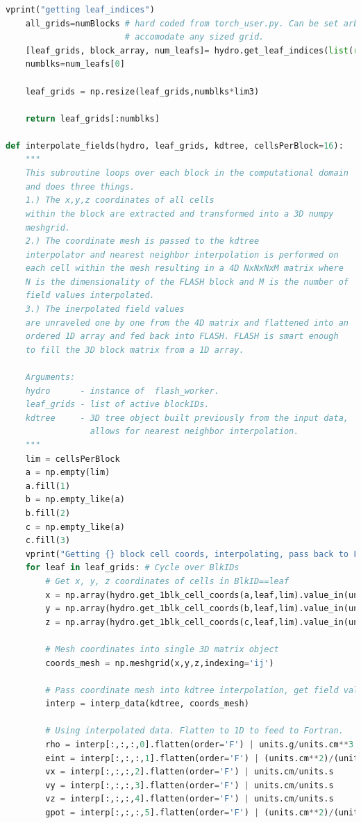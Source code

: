 \documentclass[twoside]{drexel-thesis}
\begin{document}
\begin{lstlisting}[language=python]
    vprint("getting leaf_indices")
    all_grids=numBlocks # hard coded from torch_user.py. Can be set arbitratily large to
                        # accomodate any sized grid.
    [leaf_grids, block_array, num_leafs]= hydro.get_leaf_indices(list(range(all_grids)))
    numblks=num_leafs[0]
    
    leaf_grids = np.resize(leaf_grids,numblks*lim3)
    
    return leaf_grids[:numblks]

def interpolate_fields(hydro, leaf_grids, kdtree, cellsPerBlock=16):
    """
    This subroutine loops over each block in the computational domain
    and does three things. 
    1.) The x,y,z coordinates of all cells
    within the block are extracted and transformed into a 3D numpy
    meshgrid. 
    2.) The coordinate mesh is passed to the kdtree 
    interpolator and nearest neighbor interpolation is performed on
    each cell within the mesh resulting in a 4D NxNxNxM matrix where
    N is the dimensionality of the FLASH block and M is the number of
    field values interpolated. 
    3.) The inerpolated field values
    are unraveled one by one from the 4D matrix and flattened into an
    ordered 1D array and fed back into FLASH. FLASH is smart enough
    to fill the 3D block matrix from a 1D array.
    
    Arguments:
    hydro      - instance of  flash_worker.
    leaf_grids - list of active blockIDs.
    kdtree     - 3D tree object built previously from the input data, 
                 allows for nearest neighbor interpolation.
    """
    lim = cellsPerBlock
    a = np.empty(lim)
    a.fill(1)
    b = np.empty_like(a)
    b.fill(2)
    c = np.empty_like(a)
    c.fill(3)
    vprint("Getting {} block cell coords, interpolating, pass back to FLASH.".format(leaf_grids[-1]))
    for leaf in leaf_grids: # Cycle over BlkIDs
        # Get x, y, z coordinates of cells in BlkID==leaf
        x = np.array(hydro.get_1blk_cell_coords(a,leaf,lim).value_in(units.cm))
        y = np.array(hydro.get_1blk_cell_coords(b,leaf,lim).value_in(units.cm))
        z = np.array(hydro.get_1blk_cell_coords(c,leaf,lim).value_in(units.cm))

        # Mesh coordinates into single 3D matrix object
        coords_mesh = np.meshgrid(x,y,z,indexing='ij')
        
        # Pass coordinate mesh into kdtree interpolation, get field values for each coord point.
        interp = interp_data(kdtree, coords_mesh)
        
        # Using interpolated data. Flatten to 1D to feed to Fortran.
        rho = interp[:,:,:,0].flatten(order='F') | units.g/units.cm**3
        eint = interp[:,:,:,1].flatten(order='F') | (units.cm**2)/(units.s**2)
        vx = interp[:,:,:,2].flatten(order='F') | units.cm/units.s
        vy = interp[:,:,:,3].flatten(order='F')	| units.cm/units.s
        vz = interp[:,:,:,4].flatten(order='F') | units.cm/units.s
        gpot = interp[:,:,:,5].flatten(order='F') | (units.cm**2)/(units.s**2)
        

\end{lstlisting}
\end{document}
